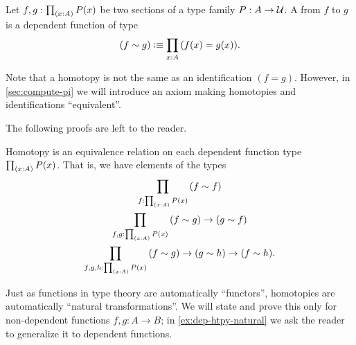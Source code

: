 \begin{defn} \label{defn:homotopy}
  Let $f,g:\prd{x:A} P(x)$ be two sections of a type family $P:A\to\mathcal{U}$.
  A 
  from $f$ to $g$ is a dependent function of type
  \begin{equation*}
    (f\htpy g) \defeq \prd{x:A} (f(x)=g(x)).
  \end{equation*}
\end{defn}

Note that a homotopy is not the same as an identification $(f=g)$.
However, in \cref{sec:compute-pi} we will introduce an axiom making homotopies and identifications ``equivalent''.

The following proofs are left to the reader.

\begin{lem}\label{lem:homotopy-props}
  Homotopy is an equivalence relation on each dependent function type $\prd{x:A} P(x)$.
  That is, we have elements of the types
  \begin{gather*}
    \prd{f:\prd{x:A} P(x)} (f\htpy f)\\
    \prd{f,g:\prd{x:A} P(x)} (f\htpy g) \to (g\htpy f)\\
    \prd{f,g,h:\prd{x:A} P(x)} (f\htpy g) \to (g\htpy h) \to (f\htpy h).
  \end{gather*}
\end{lem}


%
%
Just as functions in type theory are automatically ``functors'', homotopies are automatically
%
``natural transformations''.
We will state and prove this only for non-dependent functions $f,g:A\to B$; in \cref{ex:dep-htpy-natural} we ask the reader to generalize it to dependent functions.

